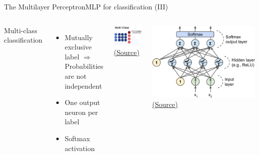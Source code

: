 \documentclass[10pt,compress]{beamer} %
\begin{document}
\begin{frame}{The Multilayer Perceptron}{MLP for classification (III)} 
    \begin{columns}
	Multi-class classification
	\begin{itemize}
		\item Mutually exclusive label $\Rightarrow$ Probabilities are not independent
		\item One output neuron per label
		\item Softmax activation
	\end{itemize}
	
	 \medskip

    	\centering \includegraphics[width=0.6\linewidth]{figs/multiclass.jpg}\\
		\tiny \href{https://www.analyticsvidhya.com/blog/2021/07/demystifying-the-difference-between-multi-class-and-multi-label-classification-problem-statements-in-deep-learning/}{(Source)}

    	\centering \includegraphics[width=0.6\paperheight]{figs/mlp-softmax.png}\\
		\tiny \href{https://www.oreilly.com/library/view/neural-networks-and/9781492037354/ch01.html}{(Source)}
	\end{columns}

\end{frame}
\end{document}
